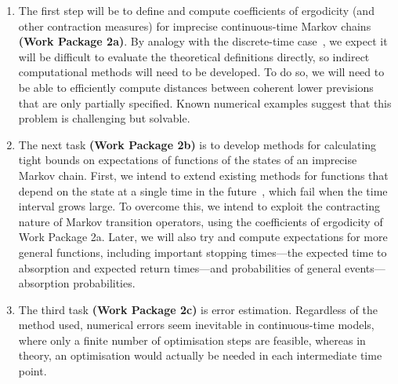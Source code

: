\documentclass[11pt,dvipsnames,usenames,a4paper]{article}
\begin{document}
\begin{enumerate}[label=\tiny$\blacksquare$,leftmargin=*,noitemsep]
\item The first step will be to define and compute coefficients of ergodicity (and other contraction measures) for imprecise continuous-time Markov chains {\bf(Work Package 2a)}. 
By analogy with the discrete-time case~\cite{skulj2013}, we expect it will be difficult to evaluate the theoretical definitions directly, so indirect computational methods will need to be developed. 
To do so, we will need to be able to efficiently compute distances between coherent lower previsions that are only partially specified. 
Known numerical examples suggest that this problem is challenging but solvable. 
\item The next task {\bf(Work Package 2b)} is to develop methods for calculating tight bounds on expectations of functions of the states of an imprecise Markov chain. 
First, we intend to extend existing methods for functions that depend on the state at a single time in the future~\cite{skulj2015:continuous:bounds}, which fail when the time interval grows large. 
To overcome this, we intend to exploit the contracting nature of Markov transition operators, using the coefficients of ergodicity of Work Package 2a. 
Later, we will also try and compute expectations for more general functions, including important stopping times---the expected time to absorption and expected return times---and probabilities of general events---absorption probabilities.
\item The third task {\bf(Work Package 2c)} is error estimation.
Regardless of the method used, numerical errors seem inevitable in continuous-time models, where only a finite number of optimisation steps are feasible, whereas in theory, an optimisation would actually be needed in each intermediate time point. 

\end{enumerate}
\end{document}
